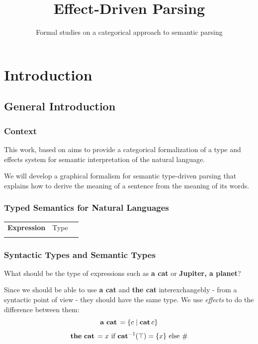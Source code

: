 \documentclass[math, english, info]{beamercours}
\title{Effect-Driven Parsing}
\subtitle{Formal studies on a categorical approach to semantic parsing}
\institute{École Normale Supérieure | Yale University}
\begin{document}
\fancytitleframe

\section{Introduction}
\subsection{General Introduction}
\begin{frame}
	\frametitle{Context}
	This work, based on \cite{bumfordEffectdrivenInterpretationFunctors2025} aims
	to provide a categorical formalization of a type and effects system for
	semantic interpretation of the natural language.

	\medskip

	We will develop a graphical formalism for semantic type-driven parsing that
	explains how to derive the meaning of a sentence from the meaning of its
	words.
\end{frame}

\begin{frame}[fragile]
	\frametitle{Typed Semantics for Natural Languages}
	\setcellgapes{3pt}
	\makegapedcells
	\begin{NiceTabular}{>{\bf}LLL}
		Expression & \rm Type & \lambda{} \\
		\CodeAfter
	\end{NiceTabular}
\end{frame}

\begin{frame}[fragile]
	\frametitle{Syntactic Types and Semantic Types}
	What should be the type of expressions such as \textbf{a cat} or \textbf{Jupiter, a planet}?
	\pause

	\smallskip

	Since we should be able to use \textbf{a cat} and \textbf{the cat} interexchangebly - from a syntactic point of view - they should have the same type.
	We use \emph{effects} to do the difference between them:
	\begin{equation*}
		\mathbf{a\ cat}\, = \{c \mid \mathbf{cat}\, c\}
	\end{equation*}
	\begin{equation*}
		\mathbf{the\ cat}\, = x \text{ if } \mathbf{cat}^{-1}(\top) = \{x\} \text{ else } \#
	\end{equation*}
\end{frame}
\end{document}
